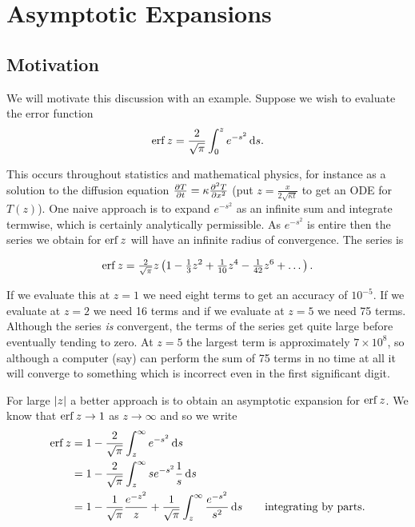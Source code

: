 \documentclass{notes}
\theoremstyle{plain}
\begin{document}
\chapter{Asymptotic Expansions}

\section{Motivation}

We will motivate this discussion with an example.  Suppose we wish to
evaluate the error function
\begin{equation}\label{eq:erf}
\operatorname{erf} z = \frac{2}{\sqrt{\pi}} \int_0^z e^{-s^2}\, \mathrm{d} s.
\end{equation}

This occurs throughout statistics and mathematical physics, for instance
as a solution to the diffusion equation
$\frac{\partial T}{\partial t} = \kappa \frac{\partial ^2 T}{\partial x^2}$ (put $z = \tfrac{x}{2 \sqrt{\kappa t}}$
to get an ODE for $T(z)$).  One naive approach is to expand
$e^{-s^2}$ as an infinite sum and integrate termwise, which is certainly
analytically permissible.  As $e^{-s^2}$ is entire then the series
we obtain for $\operatorname{erf} z$ will have an infinite radius of convergence.  The
series is

\begin{equation}\label{eq:erfT}
\operatorname{erf} z = \tfrac{2}{\sqrt{\pi}} z \left(1 - \tfrac{1}{3} z^2
+ \tfrac{1}{10} z^4 - \tfrac{1}{42} z^6 + \dots \right).
\end{equation}

If we evaluate this at $z=1$ we need eight terms to get an accuracy
of $10^{-5}$.  If we evaluate at $z=2$ we need 16 terms and if we evaluate
at $z=5$ we need 75 terms.  Although the series \emph{is} convergent,
the terms of the series get quite large before eventually tending to zero.
At $z=5$ the largest term is approximately $7 \times 10^8$, so although
a computer (say) can perform the sum of 75 terms in no time at all it
will converge to something which is incorrect even in the first significant
digit.

For large $\left|z\right|$ a better approach is to obtain an asymptotic expansion
for $\operatorname{erf} z$.  We know that $\operatorname{erf} z \to 1$ as $z \to \infty$ and so we
write
\begin{align*}
\operatorname{erf} z &= 1 - \frac{2}{\sqrt{\pi}} \int_z^\infty e^{-s^2}\, \mathrm{d} s \\
& = 1 - \frac{2}{\sqrt{\pi}} \int_z^\infty s e^{-s^2} \frac{1}{s}\, \mathrm{d} s \\
& = 1 - \frac{1}{\sqrt{\pi}} \frac{e^{-z^2}}{z} + \frac{1}{\sqrt{\pi}}
\int_z^\infty \frac{e^{-s^2}}{s^2}\, \mathrm{d} s \qquad \text{integrating by parts.}
\end{align*}
\end{document}
